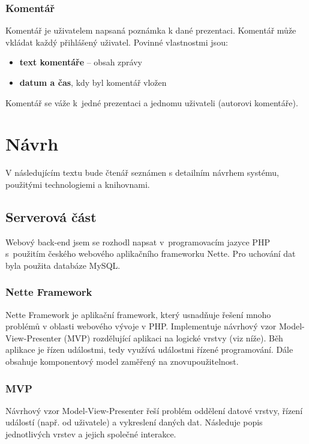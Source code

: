 \documentclass[11pt,twoside,a4paper]{book}
\newcommand*{\nomExpl}[2]{#2 (#1)\nomenclature{#1}{#2}} 	%
\begin{document}
\subsection{Komentář}
Komentář je uživatelem napsaná poznámka k dané prezentaci. Komentář může vkládat každý přihlášený uživatel. Povinné
vlastnostmi jsou:

\begin{itemize}
	\item \textbf{text komentáře} – obsah zprávy
	\item \textbf{datum a čas}, kdy byl komentář vložen
\end{itemize}

Komentář se váže k~jedné prezentaci a jednomu uživateli (autorovi komentáře).



\chapter{Návrh}
V následujícím textu bude čtenář seznámen s detailním návrhem systému, použitými technologiemi a knihovnami.

\section{Serverová část}
Webový back-end jsem se rozhodl napsat v~programovacím jazyce PHP s~použitím českého webového aplikačního frameworku Nette\cite{nette}. Pro uchování dat byla použita databáze MySQL\cite{mysql}.

\subsection{Nette Framework}
Nette Framework je aplikační framework, který usnadňuje řešení mnoho problémů v oblasti webového vývoje v PHP. Implementuje návrhový vzor \nomExpl{MVP}{Model-View-Presenter} rozdělující aplikaci na logické vrstvy (viz níže). Běh aplikace je řízen událostmi, tedy využívá událostmi řízené programování. Dále obsahuje komponentový model zaměřený na znovupoužitelnost.

\subsection{MVP}
Návrhový vzor Model-View-Presenter řeší problém oddělení datové vrstvy, řízení událostí (např. od uživatele) a vykreslení daných dat\citep{mvp}. Následuje popis jednotlivých vrstev a jejich společné interakce.
\end{document}
